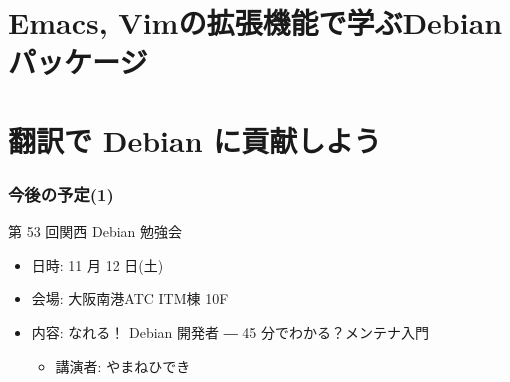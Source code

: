 \documentclass[cjk,dvipdfmx,12pt,%
hyperref={bookmarks=true,bookmarksnumbered=true,bookmarksopen=false,%
colorlinks=false,%
pdftitle={第 52 回 関西 Debian 勉強会},%
pdfauthor={倉敷・のがた・佐々木},%
pdfsubject={資料},%
}]{beamer}
\begin{document}

\section{Emacs, Vimの拡張機能で学ぶDebianパッケージ}


\section{翻訳で Debian に貢献しよう}



\begin{frame}[fragile]
\frametitle{今後の予定(1)}

\begin{block}{第 53 回関西 Debian 勉強会}
  \begin{itemize}
  \item 日時: 11 月 12 日(土)
  \item 会場: 大阪南港ATC ITM棟 10F
  \item 内容: なれる！ Debian 開発者 ― 45 分でわかる？メンテナ入門
    \begin{itemize}
    \item 講演者: やまねひでき
    \end{itemize}
  \end{itemize}
\end{block}

\end{frame}

\takahashi[50]{  }
\end{document}
